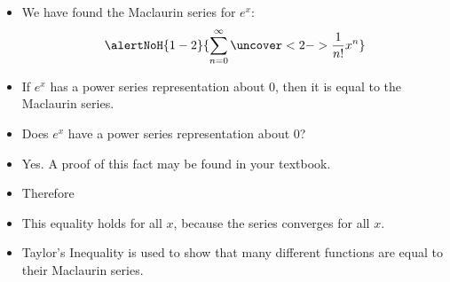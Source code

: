 \begin{frame}
\begin{itemize}
\item  We have found the Maclaurin series for $e^x$:
\abovedisplayskip=0pt
\belowdisplayskip=0pt
\[
\alertNoH{ 1-2}{\sum_{n=0}^\infty \uncover<2->{\frac{1}{n!}}x^n}
\]
\item<3->  If $e^x$ has a power series representation about $0$, then it is equal to the Maclaurin series.
\item<3->  Does $e^x$ have a power series representation about $0$?
\item<4->  Yes.  A proof of this fact may be found in your textbook.
\item<5->  Therefore
%
\item<6->  This equality holds for all $x$, because the series converges for all $x$.
\item<7->  Taylor's Inequality is used to show that many different functions are equal to their Maclaurin series.
\end{itemize}
\end{frame}
